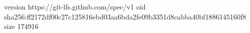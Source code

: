 version https://git-lfs.github.com/spec/v1
oid sha256:ff2172df00c27c125816ebd03aa6bda2fe09b3351d8cabba40bf1886145160f8
size 174916
